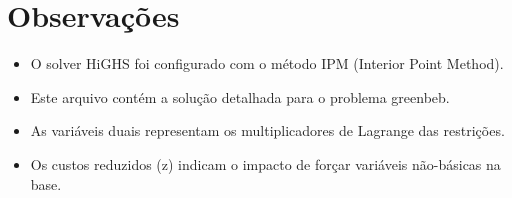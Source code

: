 \documentclass[12pt]{article}
\begin{document}
\section{Observações}

\begin{itemize}
\item O solver HiGHS foi configurado com o método IPM (Interior Point Method).
\item Este arquivo contém a solução detalhada para o problema greenbeb.
\item As variáveis duais representam os multiplicadores de Lagrange das restrições.
\item Os custos reduzidos (z) indicam o impacto de forçar variáveis não-básicas na base.
\end{itemize}
\end{document}
